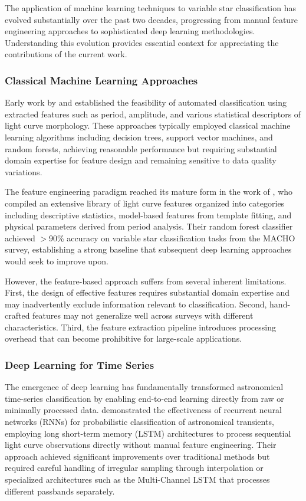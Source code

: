\documentclass[11pt,a4paper]{article}
\begin{document}
The application of machine learning techniques to variable star classification has evolved substantially over the past two decades, progressing from manual feature engineering approaches to sophisticated deep learning methodologies. Understanding this evolution provides essential context for appreciating the contributions of the current work.

\subsubsection{Classical Machine Learning Approaches}

Early work by \citet{debosscher2007automated} and \citet{sarro2009automated} established the feasibility of automated classification using extracted features such as period, amplitude, and various statistical descriptors of light curve morphology. These approaches typically employed classical machine learning algorithms including decision trees, support vector machines, and random forests, achieving reasonable performance but requiring substantial domain expertise for feature design and remaining sensitive to data quality variations.

The feature engineering paradigm reached its mature form in the work of \citet{richards2011machine}, who compiled an extensive library of light curve features organized into categories including descriptive statistics, model-based features from template fitting, and physical parameters derived from period analysis. Their random forest classifier achieved $>$90\% accuracy on variable star classification tasks from the MACHO survey, establishing a strong baseline that subsequent deep learning approaches would seek to improve upon.

However, the feature-based approach suffers from several inherent limitations. First, the design of effective features requires substantial domain expertise and may inadvertently exclude information relevant to classification. Second, hand-crafted features may not generalize well across surveys with different characteristics. Third, the feature extraction pipeline introduces processing overhead that can become prohibitive for large-scale applications.

\subsubsection{Deep Learning for Time Series}

The emergence of deep learning has fundamentally transformed astronomical time-series classification by enabling end-to-end learning directly from raw or minimally processed data. \citet{naul2018recurrent} demonstrated the effectiveness of recurrent neural networks (RNNs) for probabilistic classification of astronomical transients, employing long short-term memory (LSTM) architectures to process sequential light curve observations directly without manual feature engineering. Their approach achieved significant improvements over traditional methods but required careful handling of irregular sampling through interpolation or specialized architectures such as the Multi-Channel LSTM that processes different passbands separately.
\end{document}
